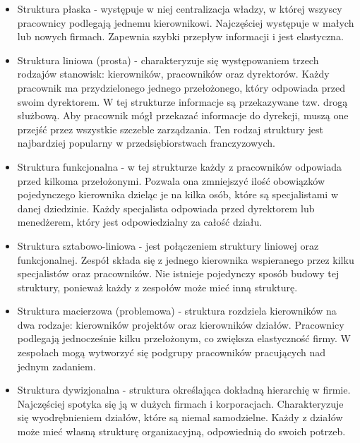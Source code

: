 \begin{itemize}
    \item Struktura płaska - występuje w niej centralizacja władzy, w której wszyscy pracownicy podlegają jednemu kierownikowi. Najczęściej występuje w małych lub nowych firmach. Zapewnia szybki przepływ informacji i jest elastyczna.

    \item Struktura liniowa (prosta) - charakteryzuje się występowaniem trzech rodzajów stanowisk: kierowników, pracowników oraz dyrektorów. Każdy pracownik ma przydzielonego jednego przełożonego, który odpowiada przed swoim dyrektorem. W tej strukturze informacje są przekazywane tzw. drogą służbową. Aby pracownik mógł przekazać informacje do dyrekcji, muszą one przejść przez wszystkie szczeble zarządzania. Ten rodzaj struktury jest najbardziej popularny w przedsiębiorstwach franczyzowych.
    
    \item Struktura funkcjonalna - w tej strukturze każdy z pracowników odpowiada przed kilkoma przełożonymi. Pozwala ona zmniejszyć ilość obowiązków pojedynczego kierownika dzieląc je na kilka osób, które są specjalistami w danej dziedzinie. Każdy specjalista odpowiada przed dyrektorem lub menedżerem, który jest odpowiedzialny za całość działu.
    
    \item Struktura sztabowo-liniowa - jest połączeniem struktury liniowej oraz funkcjonalnej. Zespół składa się z jednego kierownika wspieranego przez kilku specjalistów oraz pracowników. Nie istnieje pojedynczy sposób budowy tej struktury, ponieważ każdy z zespołów może mieć inną strukturę. 
    
    \item Struktura macierzowa (problemowa) - struktura rozdziela kierowników na dwa rodzaje: kierowników projektów oraz kierowników działów. Pracownicy podlegają jednocześnie kilku przełożonym, co zwiększa elastyczność firmy. W zespołach mogą wytworzyć się podgrupy pracowników pracujących nad jednym zadaniem.
    
    \item Struktura dywizjonalna - struktura określająca dokładną hierarchię w firmie. Najczęściej spotyka się ją w dużych firmach i korporacjach. Charakteryzuje się wyodrębnieniem działów, które są niemal samodzielne. Każdy z działów może mieć własną strukturę organizacyjną, odpowiednią do swoich potrzeb.
\end{itemize}

